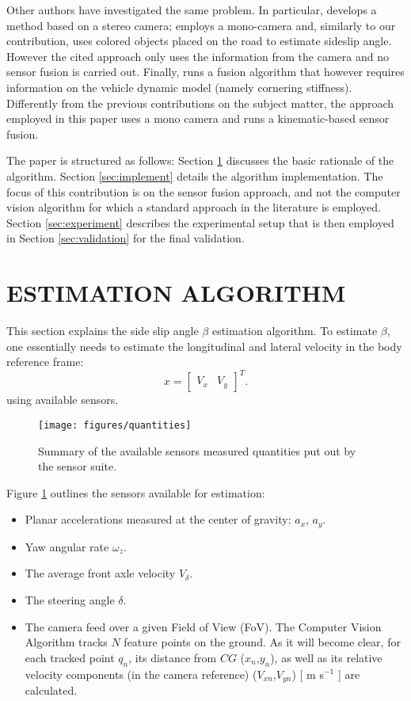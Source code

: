 \documentclass[letterpaper, 10 pt, conference]{ieeeconf}
\begin{document}
Other authors have investigated the same problem. In particular, \cite{botha2016vehicle}  develops a method based on a stereo camera; \cite{harchut2009camera} employs a mono-camera and, similarly to our contribution, uses colored objects placed on the road to estimate sideslip angle. However the cited approach only uses the information from the camera and no sensor fusion is carried out. Finally, \cite{wang2012vision} runs a fusion algorithm that however requires information on the vehicle dynamic model (namely cornering stiffness). Differently from the previous contributions on the subject matter, the approach employed in this paper uses a mono camera and runs a kinematic-based sensor fusion. 

The paper is structured as follows: Section \ref{sec:algorithm} discusses the basic rationale of the algorithm. Section \ref{sec:implement} details the algorithm implementation. The focus of this contribution is on the sensor fusion approach, and not the computer vision algorithm for which a standard approach in the literature is employed.  Section \ref{sec:experiment} describes the experimental setup that is then employed in Section \ref{sec:validation} for the final validation. 

\section{ESTIMATION ALGORITHM}\label{sec:algorithm}

This section explains the side slip angle $\beta$ estimation algorithm. To estimate $\beta$, one essentially needs to estimate the longitudinal and lateral velocity in the body reference frame: 
\begin{equation}\label{eq:x}
x = {\left[ {\begin{array}{*{20}{c}}{{V_x}}&{{V_y}}\end{array}} \right]^T}.
\end{equation}
using available sensors. 
\begin{figure}[thpb]
\centering
{}
{\texttt{[image: figures/quantities]}}
\caption{Summary of the available sensors measured quantities put out by the sensor suite.}
\label{fig:quantities}
\end{figure}
Figure \ref{fig:quantities} outlines the sensors available for estimation:
\begin{itemize}
\item Planar accelerations measured at the center of gravity: $a_x$, $a_y$.
\item Yaw angular rate $\omega_z$.
\item The average front axle velocity $V_{\delta}$. 
\item The steering angle $\delta$.
\item The camera feed over a given Field of View (FoV). The Computer Vision Algorithm tracks $N$ feature points on the ground. As it will become clear, for each tracked point $q_n$, its distance from $CG$ ($x_n$,$y_n$), as well as its relative velocity components (in the camera reference) ($V_{xn}$,$V_{yn}$) [ m s$^{-1}$ ] are calculated.
\end{itemize}
\end{document}
